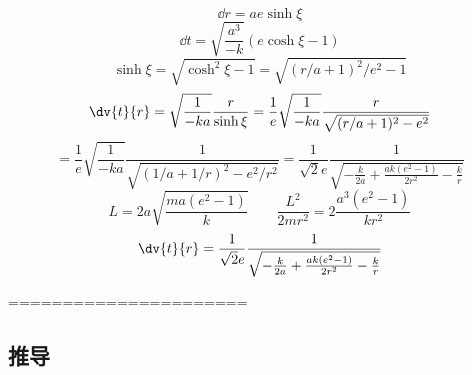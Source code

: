 \begin{equation}
\dd{r} = ae \sinh\xi
\end{equation}
\begin{equation}
\dd{t} = \sqrt{\frac{a^3}{-k}} (e \cosh \xi - 1)
\end{equation}
\begin{equation}
\sinh\xi = \sqrt{\cosh^2\xi - 1} = \sqrt{(r/a + 1)^2/e^2 - 1}
\end{equation}
\begin{equation}
\dv{t}{r} = \sqrt{\frac{1}{-ka}} \frac{r}{\sinh\xi} = \frac{1}{e}\sqrt{\frac{1}{-ka}} \frac{r}{\sqrt{(r/a + 1)^2 - e^2}}
\end{equation}
\begin{equation}
= \frac{1}{e}\sqrt{\frac{1}{-ka}} \frac{1}{\sqrt{(1/a + 1/r)^2 - e^2/r^2}}
= \frac{1}{\sqrt2 e}\frac{1}{\sqrt{-\frac{k}{2a} + \frac{ak(e^2-1)}{2r^2} - \frac{k}{r}}}
\end{equation}
\begin{equation}
L = 2a\sqrt{\frac{ma(e^2-1)}{k}}
\qquad
\frac{L^2}{2mr^2} = 2\frac{a^3(e^2-1)}{kr^2}
\end{equation}
\begin{equation}
\dv{t}{r} = \frac{1}{\sqrt2 e}\frac{1}{\sqrt{-\frac{k}{2a} + \frac{ak(e^2-1)}{2r^2} - \frac{k}{r}}}
\end{equation}




======================



\subsection{推导}
